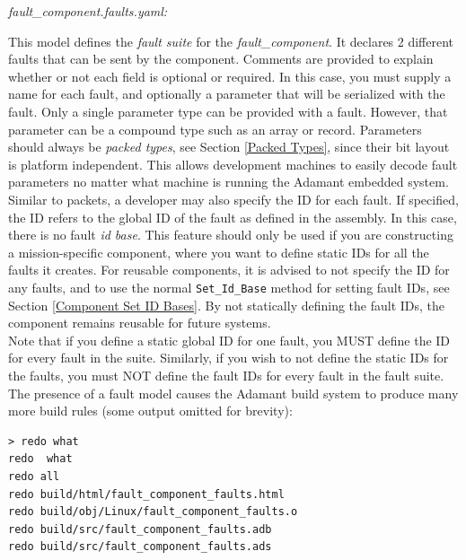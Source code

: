 \textit{fault\_component.faults.yaml:}

This model defines the \textit{fault suite} for the \textit{fault\_component}. It declares 2 different faults that can be sent by the component. Comments are provided to explain whether or not each field is optional or required. In this case, you must supply a name for each fault, and optionally a parameter that will be serialized with the fault. Only a single parameter type can be provided with a fault. However, that parameter can be a compound type such as an array or record. Parameters should always be \textit{packed types}, see Section \ref{Packed Types}, since their bit layout is platform independent. This allows development machines to easily decode fault parameters no matter what machine is running the Adamant embedded system. \\

Similar to packets, a developer may also specify the ID for each fault. If specified, the ID refers to the global ID of the fault as defined in the assembly. In this case, there is no fault \textit{id base}. This feature should only be used if you are constructing a mission-specific component, where you want to define static IDs for all the faults it creates. For reusable components, it is advised to not specify the ID for any faults, and to use the normal \texttt{Set\_Id\_Base} method for setting fault IDs, see Section \ref{Component Set ID Bases}. By not statically defining the fault IDs, the component remains reusable for future systems. \\

Note that if you define a static global ID for one fault, you MUST define the ID for every fault in the suite. Similarly, if you wish to not define the static IDs for the faults, you must NOT define the fault IDs for every fault in the fault suite. \\

The presence of a fault model causes the Adamant build system to produce many more build rules (some output omitted for brevity):

\vspace{5mm} %
\begin{verbatim}
> redo what 
redo  what
redo all
redo build/html/fault_component_faults.html
redo build/obj/Linux/fault_component_faults.o
redo build/src/fault_component_faults.adb
redo build/src/fault_component_faults.ads
\end{verbatim}
\vspace{5mm} %

